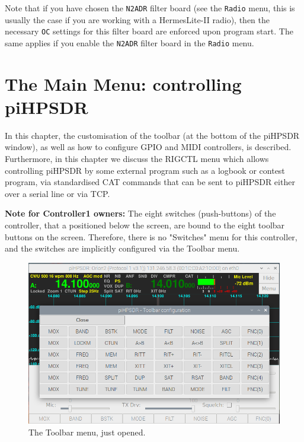 \documentclass[12pt]{book}
\def\bltt#1{\texttt{\color{blue}#1}}
\def\pH{pi\-HPSDR\xspace}
\begin{document}
Note that if you have chosen the \texttt{N2ADR} filter board (see the \bltt{Radio} menu,
this is usually the
case if you are working with a HermesLite-II radio), then the necessary \bltt{OC}
settings for this filter board are enforced upon program start. The same applies if
you enable the \texttt{N2ADR} filter board in the \bltt{Radio} menu.

\chapter[Controlling \pH]{The Main Menu: controlling \pH}

In this chapter, the customisation of the toolbar (at the bottom of the \pH window),
as well as how to configure GPIO and MIDI controllers, is described. Furthermore, in this
chapter we discuss the RIGCTL menu which allows controlling \pH by some external program
such as a logbook or contest program, via standardised CAT commands that can be sent to
\pH either over a serial line or via TCP.

\textbf{Note for Controller1 owners:} The eight switches (push-buttons) of the controller,
that a positioned below the screen, are bound to the eight toolbar buttons on the screen.
Therefore, there is no "Switches" menu for this controller, and the switches are implicitly
configured via the Toolbar menu.

\begin{figure}[ht]
\center
\includegraphics[width=12cm]{ToolbarMenu1.png}
\caption{The Toolbar menu, just opened.}
\label{fig:ToolbarMenu1}
\end{figure}
\end{document}

